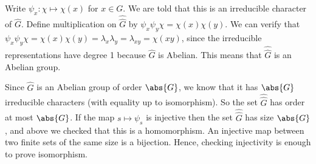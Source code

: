 \documentclass[a4paper, oneside, 10pt]{article}
\numberwithin{Answer}{section}
\numberwithin{Exercise}{section}
\begin{document}
Write $\psi_x: \chi \mapsto \chi(x)$ for $x\in  G$. 
We are told that this is an irreducible character of $\hat{G}$.
Define multiplication on $\hat{\hat{G}}$ by $\psi_x \psi_y \chi = \chi(x) \chi(y)$.
We can verify that $\psi_x \psi_y \chi = \chi(x) \chi(y) = \lambda_x \lambda_y = \lambda_{xy} = \chi(xy)$,
since the irreducible representations have degree 1 because $\hat{G}$ is Abelian.
This means that $\hat{\hat{G}}$ is an Abelian group. 

Since $\hat{G}$ is an Abelian group of order $\abs{G}$, we know that it
has $\abs{G}$ irreducible characters (with equality up to isomorphism).
So the set $\hat{\hat{G}}$ has order at most $\abs{G}$.
If the map $s \mapsto \psi_s$ is injective then the set $\hat{\hat{G}}$
has size $\abs{G}$, and above we checked that this is a homomorphism.
An injective map between two finite sets of the same size is a bijection.
Hence, checking injectivity is enough to prove isomorphism.



\nocite{*}


\end{document}
